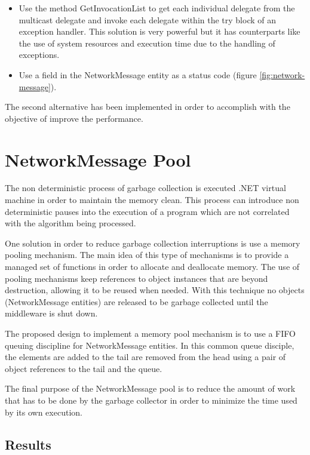 \begin{itemize}
\item Use the method GetInvocationList to get each individual delegate from the multicast delegate and invoke each delegate within the try block of an exception handler. This solution is very powerful but it has counterparts like the use of system resources and execution time due to the handling of exceptions. 
\item Use a field in the NetworkMessage entity as a status code (figure \ref{fig:network-message}).
\end{itemize}

The second alternative has been implemented in order to accomplish with the objective of improve the performance. 

\section{NetworkMessage Pool}\label{S:Network-Message-Pool}

The non deterministic process of garbage collection is executed .NET virtual machine in order to maintain the memory clean. This process can introduce non deterministic pauses into the execution of a program which are not correlated with the algorithm being processed.

One solution in order to reduce garbage collection interruptions is use a memory pooling mechanism. The main idea of this type of mechanisms is to provide a managed set of functions in order to allocate and deallocate memory. The use of pooling mechanisms keep references to object instances that are beyond destruction, allowing it to be reused when needed. With this technique no objects (NetworkMessage entities) are released to be garbage collected until the middleware is shut down.

The proposed design to implement a memory pool mechanism is to use a FIFO queuing discipline for NetworkMessage entities. In this common queue disciple, the elements are added to the tail are removed from the head using a pair of object references to the tail and the queue.

The final purpose of the NetworkMessage pool is to reduce the amount of work that has to be done by the garbage collector in order to minimize the time used by its own execution. 

\subsection{Results}\label{SS:Network-Message-Pool-Results}


